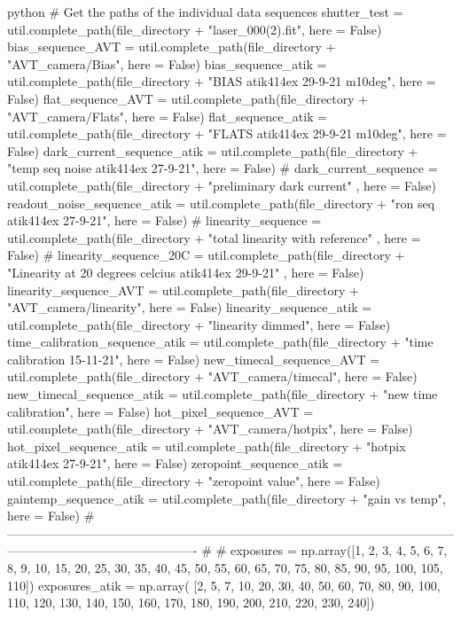 \documentclass[../main.tex]{subfiles}
\begin{document}
\begin{mintedbox}{python}
# Get the paths of the individual data sequences
shutter_test  =  util.complete_path(file_directory + "laser_000(2).fit", here  =  False)
bias_sequence_AVT  =  util.complete_path(file_directory + "AVT_camera/Bias", here  =  False)
bias_sequence_atik  =  util.complete_path(file_directory + "BIAS atik414ex 29-9-21 m10deg", here  =  False)
flat_sequence_AVT  =  util.complete_path(file_directory + "AVT_camera/Flats", here  =  False)
flat_sequence_atik  =  util.complete_path(file_directory + "FLATS atik414ex 29-9-21 m10deg", here  =  False)
dark_current_sequence_atik  =  util.complete_path(file_directory + "temp seq noise atik414ex 27-9-21", here  =  False)
# dark_current_sequence        =     util.complete_path(file_directory + "preliminary dark current"                              , here = False)
readout_noise_sequence_atik  =  util.complete_path(file_directory + "ron seq atik414ex 27-9-21", here  =  False)
# linearity_sequence           =     util.complete_path(file_directory + "total linearity with reference"                        , here = False)
# linearity_sequence_20C       =     util.complete_path(file_directory + "Linearity at 20 degrees celcius atik414ex 29-9-21"     , here = False)
linearity_sequence_AVT  =  util.complete_path(file_directory + "AVT_camera/linearity", here  =  False)
linearity_sequence_atik  =  util.complete_path(file_directory + "linearity dimmed", here  =  False)
time_calibration_sequence_atik  =  util.complete_path(file_directory + "time calibration 15-11-21", here  =  False)
new_timecal_sequence_AVT  =  util.complete_path(file_directory + "AVT_camera/timecal", here  =  False)
new_timecal_sequence_atik  =  util.complete_path(file_directory + "new time calibration", here  =  False)
hot_pixel_sequence_AVT  =  util.complete_path(file_directory + "AVT_camera/hotpix", here  =  False)
hot_pixel_sequence_atik  =  util.complete_path(file_directory + "hotpix atik414ex 27-9-21", here  =  False)
zeropoint_sequence_atik  =  util.complete_path(file_directory + "zeropoint value", here  =  False)
gaintemp_sequence_atik  =  util.complete_path(file_directory + "gain vs temp", here  =  False)
# ---------------------------------------------------------------------------------------------------------------------------------------------------------- #
# exposures  =  np.array([1, 2, 3, 4, 5, 6, 7, 8, 9, 10, 15, 20, 25, 30, 35, 40, 45, 50, 55, 60, 65, 70, 75, 80, 85, 90, 95, 100, 105, 110])
exposures_atik  =  np.array(
[2, 5, 7, 10, 20, 30, 40, 50, 60, 70, 80, 90, 100, 110, 120, 130, 140, 150, 160, 170, 180, 190, 200, 210, 220,
230, 240])


\end{mintedbox}
\end{document}
